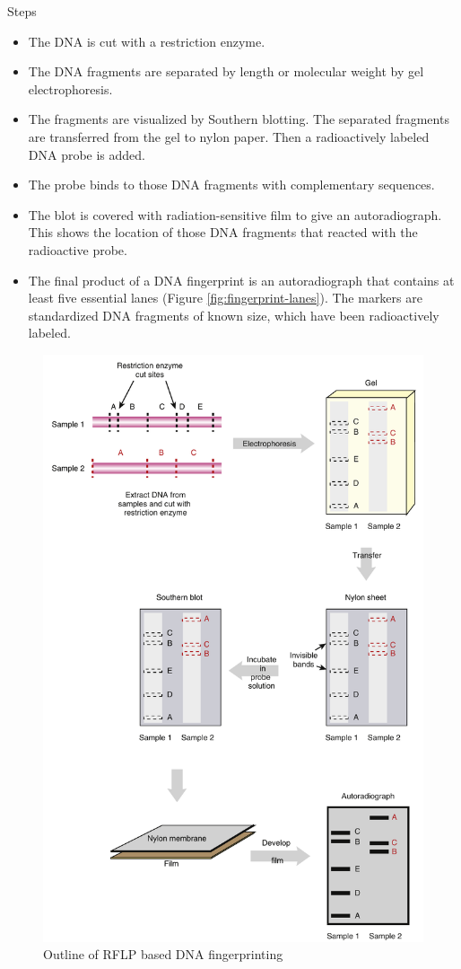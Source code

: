 \documentclass[
  ignorenonframetext,
  aspectratio=169]{beamer}
\providecommand{\tightlist}{%
  \setlength{\itemsep}{0pt}\setlength{\parskip}{0pt}}
\begin{document}
\begin{frame}{Steps}
\protect\hypertarget{steps}{}
\begin{itemize}
\tightlist
\item
  The DNA is cut with a restriction enzyme.
\item
  The DNA fragments are separated by length or molecular weight by gel
  electrophoresis.
\item
  The fragments are visualized by Southern blotting. The separated
  fragments are transferred from the gel to nylon paper. Then a
  radioactively labeled DNA probe is added.
\item
  The probe binds to those DNA fragments with complementary sequences.
\item
  The blot is covered with radiation-sensitive film to give an
  autoradiograph. This shows the location of those DNA fragments that
  reacted with the radioactive probe.
\item
  The final product of a DNA fingerprint is an autoradiograph that
  contains at least five essential lanes (Figure
  \ref{fig:fingerprint-lanes}). The markers are standardized DNA
  fragments of known size, which have been radioactively labeled.
\end{itemize}
\end{frame}

\begin{frame}{}
\protect\hypertarget{section-6}{}
\begin{figure}
\includegraphics[width=0.32\linewidth]{../images/rflp_fingerprinting} \caption{Outline of RFLP based DNA fingerprinting}\label{fig:rflp-fingerprinting}
\end{figure}
\end{frame}
\end{document}
